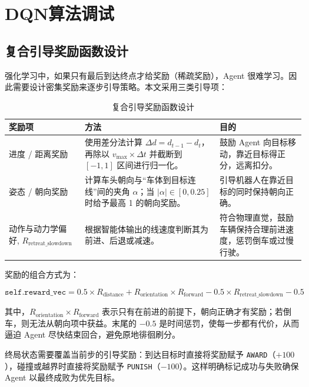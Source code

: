 \section{DQN算法调试}

\subsection{复合引导奖励函数设计}
强化学习中，如果只有最后到达终点才给奖励（稀疏奖励），Agent 很难学习。因此需要设计密集奖励来逐步引导策略。本文采用三类引导项：

\begin{table}[H]
    \centering
    \caption{复合引导奖励函数设计}
    \label{tab:reward_design}
    \begin{tabular}{p{}p{}p{}}
        \toprule
        \textbf{奖励项} & \textbf{方法} & \textbf{目的} \\
        \midrule
        进度 / 距离奖励  & 使用差分法计算 $\Delta d = d_{t-1} - d_t$，再除以 $v_{\max} \times \Delta t$ 并截断到 $[-1,1]$ 区间进行归一化。 & 鼓励 Agent 向目标移动，靠近目标得正分，远离扣分。 \\
        姿态 / 朝向奖励  & 计算车头朝向与“车体到目标连线”间的夹角 $\alpha$；当 $|\alpha|\in[0,0.25]$ 时给予最高 1 的朝向奖励。 & 引导机器人在靠近目标的同时保持朝向正确。 \\
        动作与动力学偏好, $R_{\mathrm{retreat\_slowdown}}$ & 根据智能体输出的线速度判断其为前进、后退或减速。 & 符合物理直觉，鼓励车辆保持合理前进速度，惩罚倒车或过慢行驶。 \\
        \bottomrule
    \end{tabular}
\end{table}

奖励的组合方式为：

\begin{equation}
    \texttt{self.reward\_vec} = 0.5 \times R_{\mathrm{distance}} + R_{\mathrm{orientation}} \times R_{\mathrm{forward}} - 0.5 \times R_{\mathrm{retreat\_slowdown}} - 0.5
\end{equation}

其中，$R_{\mathrm{orientation}} \times R_{\mathrm{forward}}$ 表示只有在前进的前提下，朝向正确才有奖励；若倒车，则无法从朝向项中获益。末尾的 $-0.5$ 是时间惩罚，使每一步都有代价，从而逼迫 Agent 尽快结束回合，避免原地徘徊刷分。

终局状态需要覆盖当前步的引导奖励：到达目标时直接将奖励赋予 \texttt{AWARD}（$+100$），碰撞或越界时直接将奖励赋予 \texttt{PUNISH}（$-100$）。这样明确标记成功与失败确保 Agent 以最终成败为优先目标。

